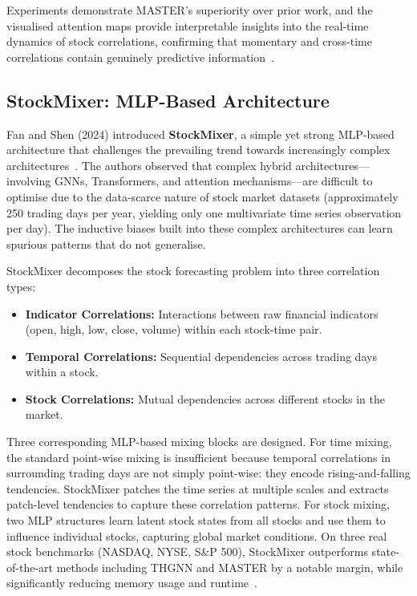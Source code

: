 \documentclass[a4paper,11pt]{report}
\begin{document}
Experiments demonstrate MASTER's superiority over prior work, and the visualised attention maps provide interpretable insights into the real-time dynamics of stock correlations, confirming that momentary and cross-time correlations contain genuinely predictive information~\cite{li2024master}.

\subsection{StockMixer: MLP-Based Architecture}

Fan and Shen (2024) introduced \textbf{StockMixer}, a simple yet strong MLP-based architecture that challenges the prevailing trend towards increasingly complex architectures~\cite{fan2024stockmixer}. The authors observed that complex hybrid architectures---involving GNNs, Transformers, and attention mechanisms---are difficult to optimise due to the data-scarce nature of stock market datasets (approximately 250 trading days per year, yielding only one multivariate time series observation per day). The inductive biases built into these complex architectures can learn spurious patterns that do not generalise.

StockMixer decomposes the stock forecasting problem into three correlation types:

\begin{itemize}
    \item \textbf{Indicator Correlations:} Interactions between raw financial indicators (open, high, low, close, volume) within each stock-time pair.
    \item \textbf{Temporal Correlations:} Sequential dependencies across trading days within a stock.
    \item \textbf{Stock Correlations:} Mutual dependencies across different stocks in the market.
\end{itemize}

Three corresponding MLP-based mixing blocks are designed. For time mixing, the standard point-wise mixing is insufficient because temporal correlations in surrounding trading days are not simply point-wise: they encode rising-and-falling tendencies. StockMixer patches the time series at multiple scales and extracts patch-level tendencies to capture these correlation patterns. For stock mixing, two MLP structures learn latent stock states from all stocks and use them to influence individual stocks, capturing global market conditions. On three real stock benchmarks (NASDAQ, NYSE, S\&P 500), StockMixer outperforms state-of-the-art methods including THGNN and MASTER by a notable margin, while significantly reducing memory usage and runtime~\cite{fan2024stockmixer}.
\end{document}
